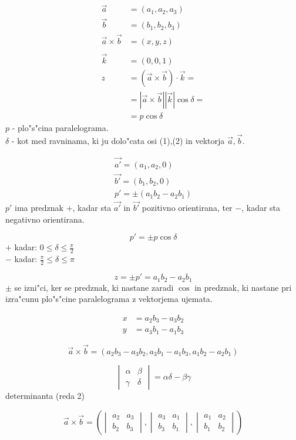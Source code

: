 \begin{align*}
	\vec{a} &= (a_1, a_2, a_3)\\
	\vec{b} &= (b_1, b_2, b_3)\\
	\vec{a} \times \vec{b} &= (x, y, z)	\\\\
	\vec{k} &= (0, 0, 1)\\
	z &= (\vec{a} \times \vec{b}) \cdot \vec{k} =\\
	&=|\vec{a}\times \vec{b}| |\vec{k}| \cos \delta =\\
	&=p \cos \delta	
\end{align*}
$p$ - plo"s"cina paralelograma.\\
$\delta$ - kot med ravninama, ki ju dolo"cata osi (1),(2) in vektorja $\vec{a}, \vec{b}$.

\begin{align*}
	\vec{a'} = (a_1, a_2, 0)\\
	\vec{b'} = (b_1, b_2, 0)\\
	p' = \pm (a_1b_2 - a_2b_1)
\end{align*}
$p'$ ima predznak $+$, kadar sta $\vec{a'}$ in $\vec{b'}$ pozitivno orientirana, ter $-$, kadar sta negativno orientirana.

$$p' = \pm p \cos \delta$$
$+$ kadar: $0 \leq \delta \leq \frac{\pi}{2}$\\
$-$ kadar: $\frac{\pi}{2} \leq \delta \leq \pi$

$$z = \pm p' = a_1b_2 - a_2b_1$$
$\pm$ se izni"ci, ker se predznak, ki nastane zaradi $\cos$ in predznak, ki nastane pri izra"cunu plo"s"cine paralelograma z vektorjema ujemata.

\begin{align*}
	x &= a_2b_3 - a_3b_2\\
	y &= a_3b_1 - a_1b_3
\end{align*}

$$\vec{a} \times \vec{b} = (a_2b_3 - a_3b_2, a_3b_1 - a_1b_3, a_1b_2 - a_2b_1)$$

\[
\begin{vmatrix}
\alpha & \beta\\
\gamma & \delta
\end{vmatrix}
= \alpha \delta - \beta \gamma
\]
determinanta (reda 2)

\[
\vec{a} \times \vec{b} = \left(
\begin{vmatrix}
a_2 & a_3\\
b_2 & b_3
\end{vmatrix}
,
\begin{vmatrix}
a_3 & a_1\\
b_3 & b_1
\end{vmatrix}
,
\begin{vmatrix}
a_1 & a_2 \\
b_1 & b_2
\end{vmatrix}
\right)
\]

